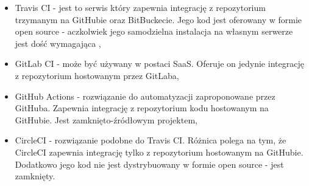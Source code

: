 \begin{itemize}
    \item Travis CI - jest to serwis który zapewnia integrację z repozytorium trzymanym na GitHubie oraz BitBuckecie. Jego kod jest oferowany w formie open source - aczkolwiek jego samodzielna instalacja na własnym serwerze jest dość wymagająca \cite{TravisCI},
    \item GitLab CI - może być używany w postaci SaaS. Oferuje on jedynie integrację z repozytorium hostowanym przez GitLaba,
    \item GitHub Actions - rozwiązanie do automatyzacji zaproponowane przez GitHuba. Zapewnia integrację z repozytorium kodu hostowanym na GitHubie. Jest zamknięto-źródłowym projektem,
    \item CircleCI - rozwiązanie podobne do Travis CI. Różnica polega na tym, że CircleCI zapewnia integrację tylko z repozytorium hostowanym na GitHubie. Dodatkowo jego kod nie jest dystrybuowany w formie open source - jest zamknięty.
\end{itemize}
